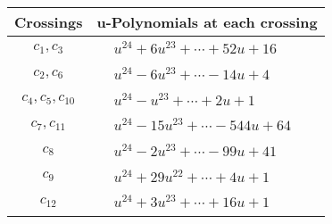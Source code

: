 \documentclass[1p]{elsarticle_modified}
\theoremstyle{definition}
\begin{document}
\begin{tabular}{m{50pt}|m{274pt}}
Crossings & \hspace{64pt}u-Polynomials at each crossing \\
\hline $$\begin{aligned}c_{1},c_{3}\end{aligned}$$&$\begin{aligned}
&u^{24}+6 u^{23}+\cdots+52 u+16
\end{aligned}$\\
\hline $$\begin{aligned}c_{2},c_{6}\end{aligned}$$&$\begin{aligned}
&u^{24}-6 u^{23}+\cdots-14 u+4
\end{aligned}$\\
\hline $$\begin{aligned}c_{4},c_{5},c_{10}\end{aligned}$$&$\begin{aligned}
&u^{24}- u^{23}+\cdots+2 u+1
\end{aligned}$\\
\hline $$\begin{aligned}c_{7},c_{11}\end{aligned}$$&$\begin{aligned}
&u^{24}-15 u^{23}+\cdots-544 u+64
\end{aligned}$\\
\hline $$\begin{aligned}c_{8}\end{aligned}$$&$\begin{aligned}
&u^{24}-2 u^{23}+\cdots-99 u+41
\end{aligned}$\\
\hline $$\begin{aligned}c_{9}\end{aligned}$$&$\begin{aligned}
&u^{24}+29 u^{22}+\cdots+4 u+1
\end{aligned}$\\
\hline $$\begin{aligned}c_{12}\end{aligned}$$&$\begin{aligned}
&u^{24}+3 u^{23}+\cdots+16 u+1
\end{aligned}$\\
\hline
\end{tabular}\\~\\
\newpage\renewcommand{\arraystretch}{1}
\end{document}
